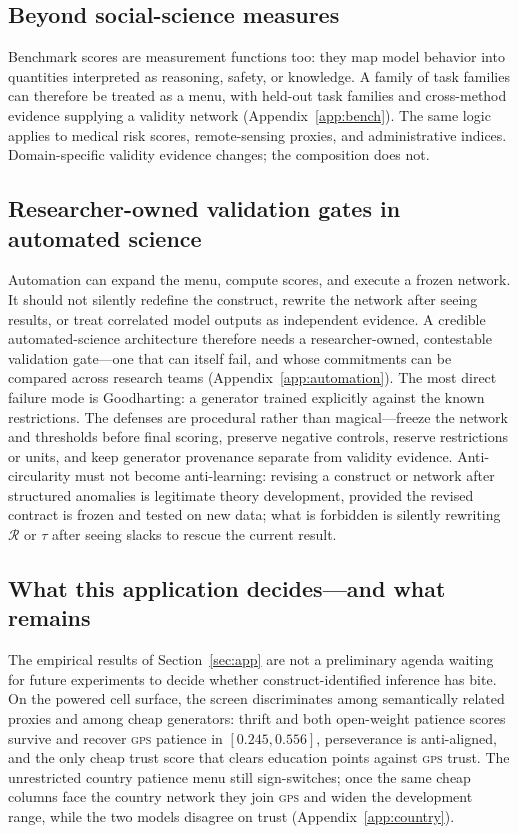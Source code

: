 \documentclass[10pt,letterpaper]{article}
\newcommand{\GPS}{\textsc{gps}}
\newcommand{\Rset}{\mathcal{R}}
\begin{document}
\subsection{Beyond social-science measures}
Benchmark scores are measurement functions too: they map model behavior into quantities interpreted as reasoning, safety, or knowledge.
A family of task families can therefore be treated as a menu, with held-out task families and cross-method evidence supplying a validity network (Appendix~\ref{app:bench}).
The same logic applies to medical risk scores, remote-sensing proxies, and administrative indices.
Domain-specific validity evidence changes; the composition does not.

\subsection{Researcher-owned validation gates in automated science}
Automation can expand the menu, compute scores, and execute a frozen network.
It should not silently redefine the construct, rewrite the network after seeing results, or treat correlated model outputs as independent evidence.
A credible automated-science architecture therefore needs a researcher-owned, contestable validation gate---one that can itself fail, and whose commitments can be compared across research teams (Appendix~\ref{app:automation}).
The most direct failure mode is Goodharting: a generator trained explicitly against the known restrictions.
The defenses are procedural rather than magical---freeze the network and thresholds before final scoring, preserve negative controls, reserve restrictions or units, and keep generator provenance separate from validity evidence.
Anti-circularity must not become anti-learning: revising a construct or network after structured anomalies is legitimate theory development, provided the revised contract is frozen and tested on new data; what is forbidden is silently rewriting $\Rset$ or $\tau$ after seeing slacks to rescue the current result.

\subsection{What this application decides---and what remains}
\label{sec:agenda}
The empirical results of Section~\ref{sec:app} are not a preliminary agenda waiting for future experiments to decide whether construct-identified inference has bite.
On the powered cell surface, the screen discriminates among semantically related proxies and among cheap generators: thrift and both open-weight patience scores survive and recover \GPS{} patience in $[0.245,0.556]$, perseverance is anti-aligned, and the only cheap trust score that clears education points against \GPS{} trust.
The unrestricted country patience menu still sign-switches; once the same cheap columns face the country network they join \GPS{} and widen the development range, while the two models disagree on trust (Appendix~\ref{app:country}).
\end{document}
